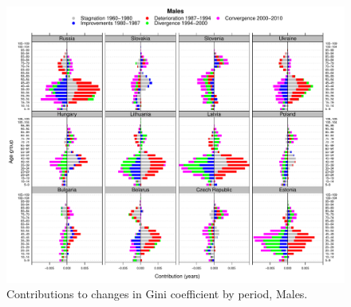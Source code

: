 \documentclass{article}
\begin{document}
\begin{figure}[h!]
\caption{Contributions to changes in Gini coefficient by period, Males.}
\centering
\begin{center}
\includegraphics[scale=.54]{Figures/F4_SS_MalesDecomp_Periods}
\end{center}

\end{figure}



\newpage

 


%
\end{document}
